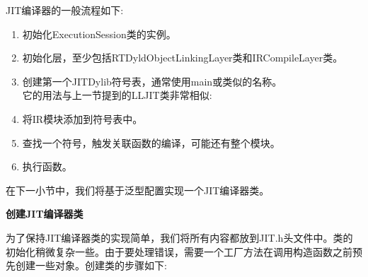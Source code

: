 JIT编译器的一般流程如下:\par

\begin{enumerate}
\item 初始化ExecutionSession类的实例。
\item 初始化层，至少包括RTDyldObjectLinkingLayer类和IRCompileLayer类。
\item 创建第一个JITDylib符号表，通常使用main或类似的名称。
\\它的用法与上一节提到的LLJIT类非常相似:
\item 将IR模块添加到符号表中。
\item 查找一个符号，触发关联函数的编译，可能还有整个模块。
\item 执行函数。
\end{enumerate}

在下一小节中，我们将基于泛型配置实现一个JIT编译器类。\par

\hspace*{\fill} \par %
\textbf{创建JIT编译器类}

为了保持JIT编译器类的实现简单，我们将所有内容都放到JIT.h头文件中。类的初始化稍微复杂一些。由于要处理错误，需要一个工厂方法在调用构造函数之前预先创建一些对象。创建类的步骤如下:\par

